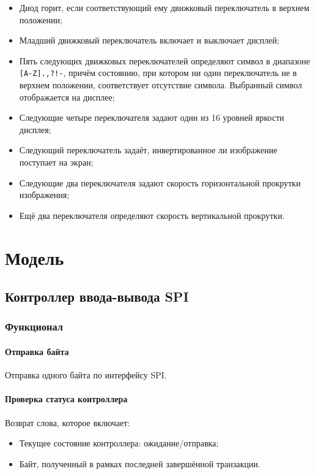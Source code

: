 \documentclass[12pt, a4paper] {ncc}
\begin{document}
\begin{itemize}
        \item Диод горит, если соответствующий ему движковый переключатель в
                верхнем положении;
        \item Младший движковый переключатель включает и выключает дисплей;
        \item Пять следующих движковых переключателей определяют символ в
                диапазоне \texttt{[A-Z].,?!-}, причём состоянию, при котором ни
                один переключатель не в верхнем положении, соответствует
                отсутствие символа. Выбранный символ отображается на дисплее;
        \item Следующие четыре переключателя задают один из 16 уровней яркости
                дисплея;
        \item Следующий переключатель задаёт, инвертированное ли изображение
                поступает на экран;
        \item Следующие два переключателя задают скорость горизонтальной
                прокрутки изображения;
        \item Ещё два переключателя определяют скорость вертикальной прокрутки.
\end{itemize}

\section{Модель}

\subsection{Контроллер ввода-вывода SPI}

\subsubsection{Функционал}

\paragraph{Отправка байта} Отправка одного байта по интерфейсу SPI.

\paragraph{Проверка статуса контроллера} Возврат слова, которое включает:

\begin{itemize}
	\item Текущее состояние контроллера: ожидание/отправка;
	\item Байт, полученный в рамках последней завершённой транзакции.
\end{itemize}
\end{document}
